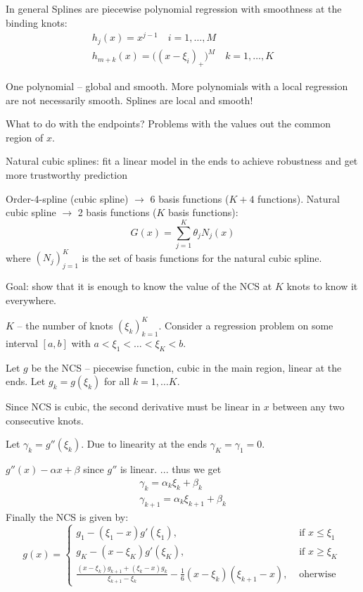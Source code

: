 \documentclass[a4paper]{article}
\newcommand{\clo}[1]{{\left [ #1 \right ]}}
\newcommand{\brac}[1]{{\left ( #1 \right )}}
\begin{document}
In general Splines are piecewise polynomial regression with smoothness at the binding knots:
\begin{align*}
	h_j(x) = x^{j-1}\quad i=1,\ldots, M\\
	h_{m+k}(x) = \big((x-\xi_i)_+\big)^M \quad k=1,\ldots,K
\end{align*}

One polynomial -- global and smooth.
More polynomials with a local regression are not necessarily smooth.
Splines are local and smooth!

What to do with the endpoints?
Problems with the values out the common region of $x$.

Natural cubic splines: fit a linear model in the ends to achieve robustness and get more trustworthy prediction

Order-4-spline (cubic spline) $\to$ 6 basis functions ($K+4$ functions).
Natural cubic spline $\to$ 2 basis functions ($K$ basis functions):
\[G(x) = \sum_{j=1}^K \theta_j N_j(x)\]
where $\brac{N_j}_{j=1}^K$ is the set of basis functions for the natural cubic spline.

Goal: show that it is enough to know the value of the NCS at $K$ knots to know it everywhere.

$K$ -- the number of knots $\brac{\xi_k}_{k=1}^K$. Consider a regression problem on some interval $\clo{a,b}$ with $a<\xi_1<\ldots<\xi_K<b$.

Let $g$ be the NCS -- piecewise function, cubic in the main region, linear at the ends.
Let $g_k = g(\xi_k)$ for all $k=1,\ldots K$.

Since NCS is cubic, the second derivative must be linear in $x$ between any two consecutive knots.

Let $\gamma_k=g''(\xi_k)$. Due to linearity at the ends $\gamma_K = \gamma_1 = 0$.

$g''(x) - \alpha x + \beta$ since $g''$ is linear.
...
thus we get
\[
\begin{matrix}
	\gamma_k = \alpha_k \xi_k + \beta_k \\
	\gamma_{k+1} = \alpha_k \xi_{k+1} + \beta_k
\end{matrix}
\]
Finally the NCS is given by:
\[
g(x) = \begin{cases}
	g_1 - (\xi_1-x)g'(\xi_1), &\text{ if } x\leq \xi_1\\
	g_K - (x-\xi_K)g'(\xi_K), &\text{ if } x\geq \xi_K\\
	\frac{(x-\xi_k)g_{k+1} + (\xi_k-x)g_k}{\xi_{k+1}-\xi_k}
		- \frac{1}{6}(x-\xi_k)(\xi_{k+1}-x), &\text{ oherwise }
\end{cases}
\]
\end{document}
